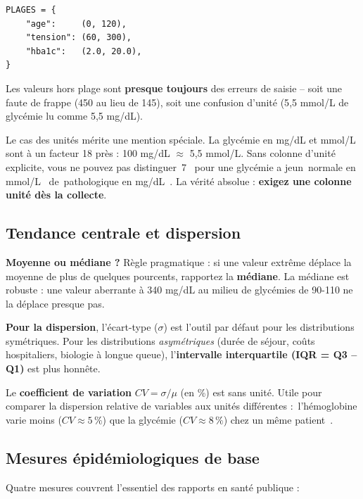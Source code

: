 \documentclass[11pt,a4paper]{article}
\providecommand{\og}{\guillemotleft\,}
\providecommand{\fg}{\,\guillemotright}
\begin{document}
\begin{verbatim}
PLAGES = {
    "age":     (0, 120),
    "tension": (60, 300),
    "hba1c":   (2.0, 20.0),
}
\end{verbatim}

Les valeurs hors plage sont \textbf{presque toujours} des erreurs de
saisie -- soit une faute de frappe (450 au lieu de 145), soit une
confusion d'unit\'e (5{,}5 mmol/L de glyc\'emie lu comme 5{,}5 mg/dL).

\begin{clinique}
Le cas des unit\'es m\'erite une mention sp\'eciale. La glyc\'emie en
mg/dL et mmol/L sont \`a un facteur 18 pr\`es : 100 mg/dL $\approx$ 5{,}5
mmol/L. Sans colonne d'unit\'e explicite, vous ne pouvez pas distinguer
\og 7 \fg{} pour une glyc\'emie a jeun
\og normale en mmol/L \fg{} de \og pathologique en mg/dL \fg{}. La
v\'erit\'e absolue : \textbf{exigez une colonne unit\'e d\`es la collecte}.
\end{clinique}

\subsection{Tendance centrale et dispersion}

\textbf{Moyenne ou m\'ediane ?} R\`egle pragmatique : si une valeur
extr\^eme d\'eplace la moyenne de plus de quelques pourcents, rapportez
la \textbf{m\'ediane}. La m\'ediane est robuste : une valeur aberrante \`a
340 mg/dL au milieu de glyc\'emies de 90-110 ne la d\'eplace presque
pas.

\textbf{Pour la dispersion}, l'\'ecart-type ($\sigma$) est l'outil par
d\'efaut pour les distributions sym\'etriques. Pour les distributions
\emph{asym\'etriques} (dur\'ee de s\'ejour, co\^uts hospitaliers, biologie
\`a longue queue), l'\textbf{intervalle interquartile (IQR = Q3 -- Q1)}
est plus honn\^ete.

Le \textbf{coefficient de variation} $CV = \sigma / \mu$ (en \%) est
sans unit\'e. Utile pour comparer la dispersion relative de variables
aux unit\'es diff\'erentes :
\og l'h\'emoglobine varie moins ($CV \approx 5\,\%$) que la
glyc\'emie ($CV \approx 8\,\%$) chez un m\^eme patient \fg{}.

\subsection{Mesures \'epid\'emiologiques de base}

Quatre mesures couvrent l'essentiel des rapports en sant\'e publique :
\end{document}
